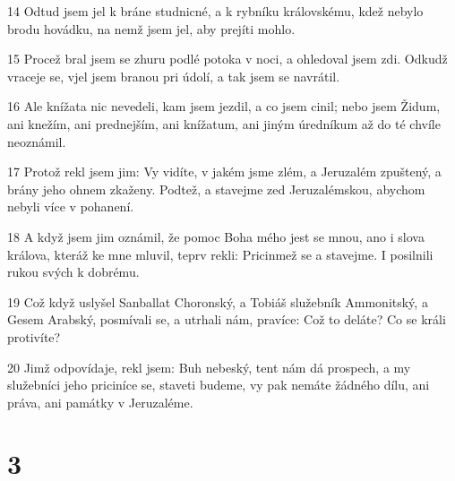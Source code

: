 \par 14 Odtud jsem jel k bráne studnicné, a k rybníku královskému, kdež nebylo brodu hovádku, na nemž jsem jel, aby prejíti mohlo.
\par 15 Procež bral jsem se zhuru podlé potoka v noci, a ohledoval jsem zdi. Odkudž vraceje se, vjel jsem branou pri údolí, a tak jsem se navrátil.
\par 16 Ale knížata nic nevedeli, kam jsem jezdil, a co jsem cinil; nebo jsem Židum, ani knežím, ani prednejším, ani knížatum, ani jiným úredníkum až do té chvíle neoznámil.
\par 17 Protož rekl jsem jim: Vy vidíte, v jakém jsme zlém, a Jeruzalém zpuštený, a brány jeho ohnem zkaženy. Podtež, a stavejme zed Jeruzalémskou, abychom nebyli více v pohanení.
\par 18 A když jsem jim oznámil, že pomoc Boha mého jest se mnou, ano i slova králova, kteráž ke mne mluvil, teprv rekli: Pricinmež se a stavejme. I posilnili rukou svých k dobrému.
\par 19 Což když uslyšel Sanballat Choronský, a Tobiáš služebník Ammonitský, a Gesem Arabský, posmívali se, a utrhali nám, pravíce: Což to deláte? Co se králi protivíte?
\par 20 Jimž odpovídaje, rekl jsem: Buh nebeský, tent nám dá prospech, a my služebníci jeho priciníce se, staveti budeme, vy pak nemáte žádného dílu, ani práva, ani památky v Jeruzaléme.

\chapter{3}

